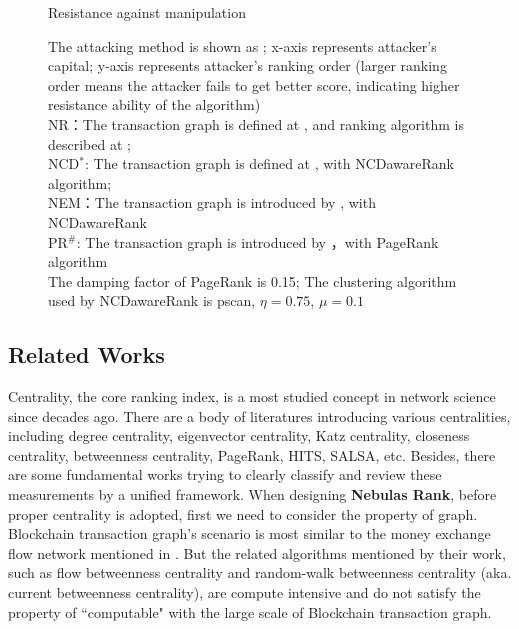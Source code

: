 \begin{figure}[htbp]
	\caption{Resistance against manipulation} \label{fig:antiManipulation}
	\caption*{\footnotesize{The attacking method is shown as ; x-axis represents attacker's capital; y-axis represents attacker's ranking order (larger ranking order means the attacker fails to get better score, indicating higher resistance ability of the algorithm)  \\
	NR：The transaction graph is defined at , and ranking algorithm is described at ; \\
	NCD$^*$: The transaction graph is defined at , with NCDawareRank algorithm; \\
	NEM：The transaction graph is introduced by \cite{nem}, with NCDawareRank\\ 
	PR$^{\#}$: The transaction graph is introduced by \cite{nem}，with PageRank algorithm\\ 
	The damping factor of PageRank is 0.15; The clustering algorithm used by NCDawareRank is pscan\cite{chang2017mathsf}, $\eta=0.75$, $\mu=0.1$}}
\end{figure}

\subsection{Related Works} \label{subsec:related}

Centrality, the core ranking index, is a most studied concept in network science since decades ago\cite{newman2010networks}. There are a body of literatures introducing various centralities, including degree centrality\cite{freeman1979set}, eigenvector centrality\cite{bonacich1972factoring}, Katz centrality\cite{katz1953new}, closeness centrality\cite{sabidussi1966centrality}, betweenness centrality\cite{freeman1977set}\cite{freeman1978centrality}\cite{freeman1991centrality}\cite{noh2004random}\cite{newman2005measure}, PageRank\cite{Brin2010}, HITS\cite{kleinberg1999authoritative}, SALSA\cite{Science2001}, etc. Besides, there are some fundamental works trying to clearly classify and review these measurements by a unified framework\cite{Borgatti2005}\cite{Borgatti2006}\cite{Lu2016}. When designing \textbf{Nebulas Rank}, before proper centrality is adopted, first we need to consider the property of graph. Blockchain transaction graph's scenario is most similar to the money exchange flow network mentioned in \cite{Borgatti2005}. But the related algorithms mentioned by their work, such as flow betweenness centrality\cite{freeman1991centrality} and random-walk betweenness centrality (aka. current betweenness centrality)\cite{newman2005measure}, are compute intensive and do not satisfy the property of ``computable" with the large scale of Blockchain transaction graph.

